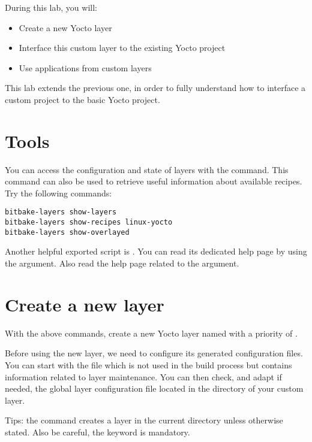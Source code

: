 
During this lab, you will:
\begin{itemize}
  \item Create a new Yocto layer
  \item Interface this custom layer to the existing Yocto project
  \item Use applications from custom layers
\end{itemize}

This lab extends the previous one, in order to fully understand how to interface
a custom project to the basic Yocto project.

\section{Tools}

You can access the configuration and state of layers with the
 command. This command can also be used to retrieve useful
information about available recipes. Try the following commands:
\begin{verbatim}
bitbake-layers show-layers
bitbake-layers show-recipes linux-yocto
bitbake-layers show-overlayed
\end{verbatim}

Another helpful exported script is . You can read its dedicated
help page by using the  argument. Also read the help page related to
the  argument.

\section{Create a new layer}

With the above commands, create a new Yocto layer named
 with a priority of .

Before using the new layer, we need to configure its generated configuration
files. You can start with the  file which is not used in the build
process but contains information related to layer maintenance. You can then
check, and adapt if needed, the global layer configuration file located in the
 directory of your custom layer.

Tips: the  command creates a layer in the current directory
unless otherwise stated. Also be careful, the  keyword is mandatory.


